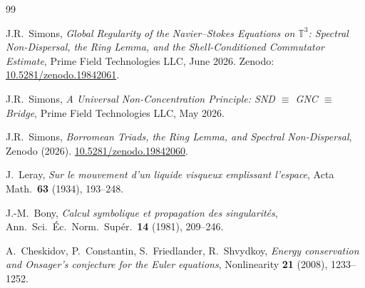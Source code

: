 \documentclass[11pt]{article}
\begin{document}
\begin{thebibliography}{99}

J.R.~Simons,
\textit{Global Regularity of the Navier--Stokes Equations on $\mathbb{T}^3$:
Spectral Non-Dispersal, the Ring Lemma, and the Shell-Conditioned Commutator Estimate},
Prime Field Technologies LLC, June 2026. Zenodo: \href{https://doi.org/10.5281/zenodo.19842061}{10.5281/zenodo.19842061}.

J.R.~Simons,
\textit{A Universal Non-Concentration Principle: SND $\equiv$ GNC $\equiv$ Bridge},
Prime Field Technologies LLC, May 2026.

J.R.~Simons,
\textit{Borromean Triads, the Ring Lemma, and Spectral Non-Dispersal},
Zenodo (2026). \href{https://doi.org/10.5281/zenodo.19842060}{10.5281/zenodo.19842060}.

J.~Leray,
\textit{Sur le mouvement d'un liquide visqueux emplissant l'espace},
Acta Math.\ \textbf{63} (1934), 193--248.

J.-M.~Bony,
\textit{Calcul symbolique et propagation des singularit\'es},
Ann.\ Sci.\ \'Ec.\ Norm.\ Sup\'er.\ \textbf{14} (1981), 209--246.

A.~Cheskidov, P.~Constantin, S.~Friedlander, R.~Shvydkoy,
\textit{Energy conservation and Onsager's conjecture for the Euler equations},
Nonlinearity \textbf{21} (2008), 1233--1252.

\end{thebibliography}
\end{document}
